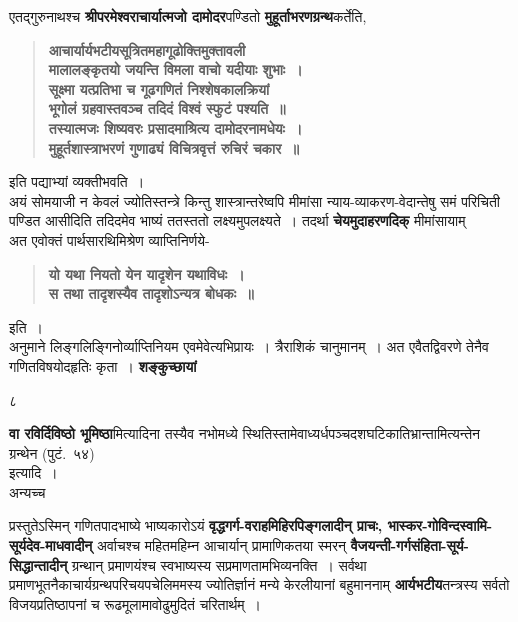 \documentclass[11pt, openany]{book}
\begin{document}
एतद्गुरुनाथश्च \textbf{श्रीपरमेश्वराचार्यात्मजो दामोदर}पण्डितो \textbf{मुहूर्ताभरणग्रन्थ}कर्तेति,
\begin{quote}
\textbf{आचार्यार्यभटीयसूत्रितमहागूढोक्तिमुक्तावली\\
मालालङ्कृतयो जयन्ति विमला वाचो यदीयाः शुभाः~।\\
सूक्ष्मा यत्प्रतिभा च गूढगणितं निश्शेषकालक्रियां\\
भूगोलं ग्रहवास्तवञ्च तदिदं विश्वं स्फुटं पश्यति~॥\\
तस्यात्मजः शिष्यवरः प्रसादमाश्रित्य दामोदरनामधेयः~।\\
मुहूर्तशास्त्राभरणं गुणाढ्यं विचित्रवृत्तं रुचिरं चकार~॥}
\end{quote}

\noindent इति पद्याभ्यां व्यक्तीभवति~। \\

अयं सोमयाजी न केवलं ज्योतिस्तन्त्रे किन्तु शास्त्रान्तरेष्वपि मीमांसा न्याय-व्याकरण-वेदान्तेषु समं परिचिती पण्डित आसीदिति तदिदमेव भाष्यं ततस्ततो लक्ष्यमुपलक्ष्यते~। तदर्था \textbf{चेयमुदाहरणदिक्} मीमांसायाम्\textendash \\

अत एवोक्तं पार्थसारथिमिश्रेण व्याप्तिनिर्णये-
\begin{quote}
\textbf{यो यथा नियतो येन यादृशेन यथाविधः~।\\
स तथा तादृशस्यैव तादृशोऽन्यत्र बोधकः~॥}
\end{quote}

\noindent इति~। \\

अनुमाने लिङ्गलिङ्गिनोर्व्याप्तिनियम एवमेवेत्यभिप्रायः~। त्रैराशिकं चानुमानम्~। अत एवैतद्विवरणे तेनैव गणितविषयोदहृतिः कृता~। \textbf{शङ्कुच्छायां}

\newpage

\begin{center}
८
\end{center}
\thispagestyle{empty} 
\noindent \textbf{वा रविर्दिविष्ठो भूमिष्ठा}मित्यादिना तस्यैव नभोमध्ये स्थितिस्तामेवाध्यर्धपञ्चदशघटिकातिभ्रान्तामित्यन्तेन ग्रन्थेन (पुटं.~५४) \\

\noindent इत्यादि~।\\

\indent अन्यच्च\textendash \\
\begin{sloppypar} 
प्रस्तुतेऽस्मिन् गणितपादभाष्ये भाष्यकारोऽयं \textbf{वृद्धगर्ग-वराहमिहिरपिङ्गलादीन् प्राचः, भास्कर-गोविन्दस्वामि-सूर्यदेव-माधवादीन्} अर्वाचश्च महितमहिम्न आचार्यान् प्रामाणिकतया स्मरन् \textbf{वैजयन्ती-गर्गसंहिता-सूर्य-सिद्धान्तादीन्} ग्रन्थान् प्रमाणयंश्च स्वभाष्यस्य सप्रमाणतामभिव्यनक्ति~। सर्वथा प्रमाणभूतनैकाचार्यग्रन्थपरिचयपचेलिममस्य ज्योतिर्ज्ञानं मन्ये केरलीयानां बहुमाननाम् \textbf{आर्यभटीय}तन्त्रस्य सर्वतो विजयप्रतिष्ठापनां च रूढमूलामावोढुमुदितं चरितार्थम्~।\\
\end{sloppypar} 
\end{document}
